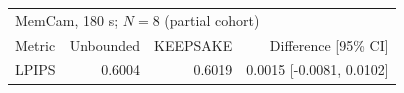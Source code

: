 \begin{tabular}{lrrr}
\toprule
\multicolumn{4}{l}{MemCam, 180 s; $N=8$ (partial cohort)} \\
Metric & Unbounded & KEEPSAKE & Difference [95\% CI] \\
\midrule
LPIPS & 0.6004 & 0.6019 & 0.0015 [-0.0081, 0.0102] \\
\bottomrule
\end{tabular}
